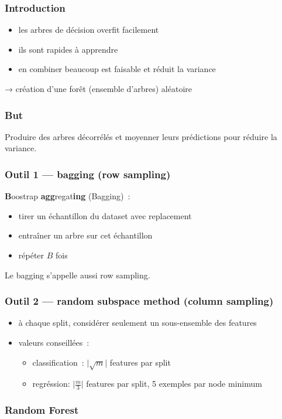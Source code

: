 \begin{frame}
  \frametitle{Introduction}
  \begin{itemize}
  \item les arbres de décision overfit facilement
  \item ils sont rapides à apprendre
  \item en combiner beaucoup est faisable et réduit la variance
  \end{itemize}
  → création d'une forêt (ensemble d'arbres) aléatoire
\end{frame}

\begin{frame}
  \frametitle{But}
  Produire des arbres décorrélés et moyenner leurs prédictions pour
  réduire la variance.
\end{frame}

\begin{frame}
  \frametitle{Outil 1 — bagging (row sampling)}
  \textbf{B}oostrap \textbf{agg}regat\textbf{ing} (Bagging) :
  \begin{itemize}
  \item tirer un échantillon du dataset avec replacement
  \item entraîner un arbre sur cet échantillon
  \item répéter $B$ fois
  \end{itemize}
  Le bagging s'appelle aussi row sampling.
\end{frame}

\begin{frame}
  \frametitle{Outil 2 — random subspace method (column sampling)}
  \begin{itemize}
  \item à chaque split, considérer seulement un sous-ensemble des
    features
  \item valeurs conseillées :
    \begin{itemize}
    \item classification : $\lvert\sqrt m\rvert$ features par split
    \item regréssion: $\lvert\frac{m}{3}\rvert$ features par split, 5
      exemples par node minimum
    \end{itemize}
  \end{itemize}
\end{frame}

\begin{frame}
  \frametitle{Random Forest}
\end{frame}

